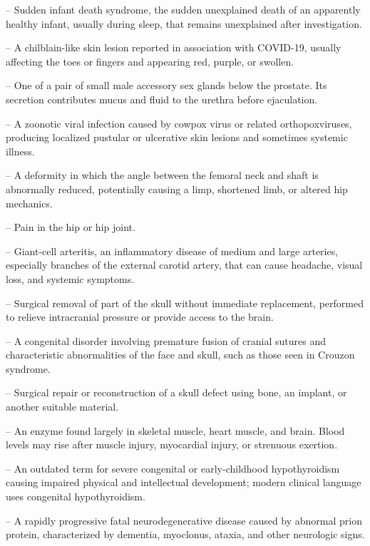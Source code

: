 -- Sudden infant death syndrome, the sudden unexplained death of an apparently healthy infant, usually during sleep, that remains unexplained after investigation.

-- A chilblain-like skin lesion reported in association with COVID-19, usually affecting the toes or fingers and appearing red, purple, or swollen.

-- One of a pair of small male accessory sex glands below the prostate. Its secretion contributes mucus and fluid to the urethra before ejaculation.

-- A zoonotic viral infection caused by cowpox virus or related orthopoxviruses, producing localized pustular or ulcerative skin lesions and sometimes systemic illness.

-- A deformity in which the angle between the femoral neck and shaft is abnormally reduced, potentially causing a limp, shortened limb, or altered hip mechanics.

-- Pain in the hip or hip joint.

-- Giant-cell arteritis, an inflammatory disease of medium and large arteries, especially branches of the external carotid artery, that can cause headache, visual loss, and systemic symptoms.

-- Surgical removal of part of the skull without immediate replacement, performed to relieve intracranial pressure or provide access to the brain.

-- A congenital disorder involving premature fusion of cranial sutures and characteristic abnormalities of the face and skull, such as those seen in Crouzon syndrome.

-- Surgical repair or reconstruction of a skull defect using bone, an implant, or another suitable material.

-- An enzyme found largely in skeletal muscle, heart muscle, and brain. Blood levels may rise after muscle injury, myocardial injury, or strenuous exertion.

-- An outdated term for severe congenital or early-childhood hypothyroidism causing impaired physical and intellectual development; modern clinical language uses congenital hypothyroidism.

-- A rapidly progressive fatal neurodegenerative disease caused by abnormal prion protein, characterized by dementia, myoclonus, ataxia, and other neurologic signs.

